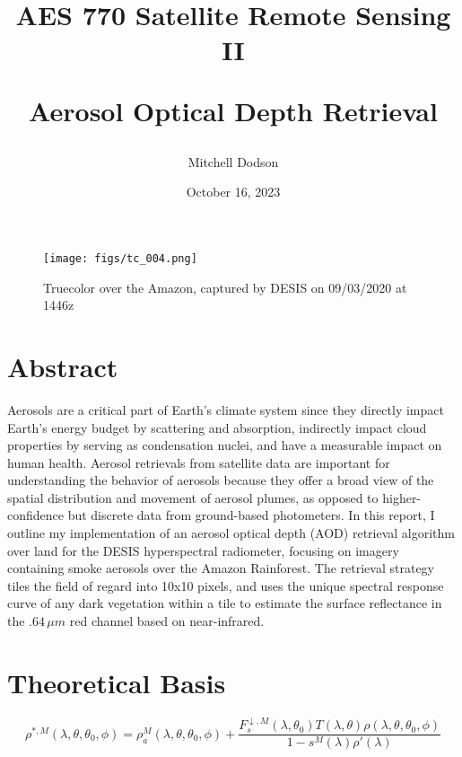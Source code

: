 \documentclass[12pt]{article}
\title{AES 770 Satellite Remote Sensing II

Aerosol Optical Depth Retrieval}
\author{Mitchell Dodson}
\date{October 16, 2023}
\begin{document}
\maketitle

\vspace{-2em}

\begin{figure}[h!]
    \centering
    \texttt{[image: figs/tc\_004.png]}
    \caption{Truecolor over the Amazon, captured by DESIS on 09/03/2020 at 1446z}
    \label{title_image}
\end{figure}

\section{Abstract}

Aerosols are a critical part of Earth's climate system since they directly impact Earth's energy budget by scattering and absorption, indirectly impact cloud properties by serving as condensation nuclei, and have a measurable impact on human health. Aerosol retrievals from satellite data are important for understanding the behavior of aerosols because they offer a broad view of the spatial distribution and movement of aerosol plumes, as opposed to higher-confidence but discrete data from ground-based photometers. In this report, I outline my implementation of an aerosol optical depth (AOD) retrieval algorithm over land for the DESIS hyperspectral radiometer, focusing on imagery containing smoke aerosols over the Amazon Rainforest. The retrieval strategy tiles the field of regard into 10x10 pixels, and uses the unique spectral response curve of any dark vegetation within a tile to estimate the surface reflectance in the $.64\,\si{\mu m}$ red channel based on near-infrared.


\section{Theoretical Basis}

\begin{equation}\label{toa_ref}
    \rho^{*,M}(\lambda, \theta, \theta_0, \phi) = \rho_a^M(\lambda, \theta, \theta_0, \phi) + \frac{F_s^{\downarrow,M}(\lambda, \theta_0)T(\lambda, \theta)\rho(\lambda, \theta, \theta_0, \phi)}{1-s^M(\lambda)\rho'(\lambda)}
\end{equation}
\end{document}
